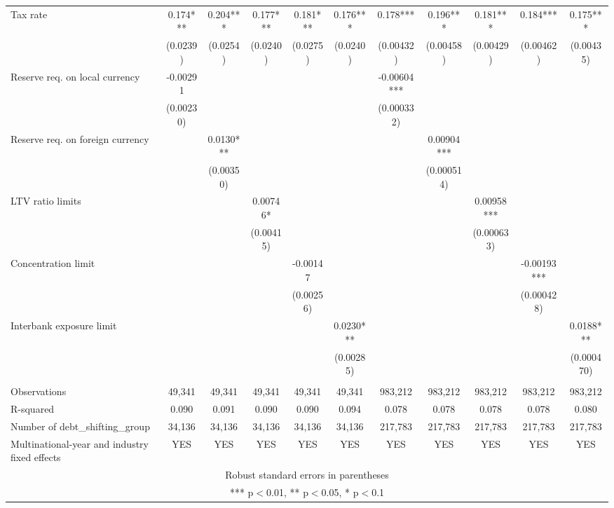 \begin{tabular}{lcccccccccc}
Tax rate & 0.174*** & 0.204*** & 0.177*** & 0.181*** & 0.176*** & 0.178*** & 0.196*** & 0.181*** & 0.184*** & 0.175*** \\
 & (0.0239) & (0.0254) & (0.0240) & (0.0275) & (0.0240) & (0.00432) & (0.00458) & (0.00429) & (0.00462) & (0.00435) \\
Reserve req. on local currency & -0.00291 &  &  &  &  & -0.00604*** &  &  &  &  \\
 & (0.00230) &  &  &  &  & (0.000332) &  &  &  &  \\
Reserve req. on foreign currency &  & 0.0130*** &  &  &  &  & 0.00904*** &  &  &  \\
 &  & (0.00350) &  &  &  &  & (0.000514) &  &  &  \\
LTV ratio limits &  &  & 0.00746* &  &  &  &  & 0.00958*** &  &  \\
 &  &  & (0.00415) &  &  &  &  & (0.000633) &  &  \\
Concentration limit &  &  &  & -0.00147 &  &  &  &  & -0.00193*** &  \\
 &  &  &  & (0.00256) &  &  &  &  & (0.000428) &  \\
Interbank exposure limit &  &  &  &  & 0.0230*** &  &  &  &  & 0.0188*** \\
 &  &  &  &  & (0.00285) &  &  &  &  & (0.000470) \\
 &  &  &  &  &  &  &  &  &  &  \\
Observations & 49,341 & 49,341 & 49,341 & 49,341 & 49,341 & 983,212 & 983,212 & 983,212 & 983,212 & 983,212 \\
R-squared & 0.090 & 0.091 & 0.090 & 0.090 & 0.094 & 0.078 & 0.078 & 0.078 & 0.078 & 0.080 \\
Number of debt\_shifting\_group & 34,136 & 34,136 & 34,136 & 34,136 & 34,136 & 217,783 & 217,783 & 217,783 & 217,783 & 217,783 \\
 Multinational-year and industry fixed effects & YES & YES & YES & YES & YES & YES & YES & YES & YES & YES \\ \hline
\multicolumn{11}{c}{ Robust standard errors in parentheses} \\
\multicolumn{11}{c}{ *** p$<$0.01, ** p$<$0.05, * p$<$0.1} \\
\end{tabular}
